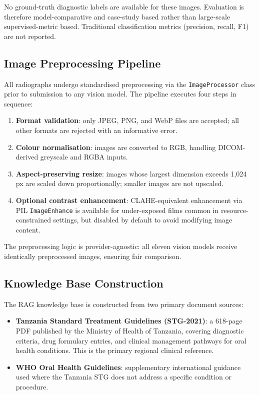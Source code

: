 \documentclass[12pt,a4paper]{report}
\begin{document}
No ground-truth diagnostic labels are available for these images.
Evaluation is therefore model-comparative and case-study based rather
than large-scale supervised-metric based.  Traditional classification
metrics (precision, recall, F1) are not reported.

\subsection{Image Preprocessing Pipeline}
\label{subsec:preproc}

All radiographs undergo standardised preprocessing via the
\texttt{ImageProcessor} class prior to submission to any vision model.
The pipeline executes four steps in sequence:

\begin{enumerate}
  \item \textbf{Format validation}: only JPEG, PNG, and WebP files are
        accepted; all other formats are rejected with an informative
        error.
  \item \textbf{Colour normalisation}: images are converted to RGB,
        handling DICOM-derived greyscale and RGBA inputs.
  \item \textbf{Aspect-preserving resize}: images whose largest
        dimension exceeds 1,024 px are scaled down proportionally;
        smaller images are not upscaled.
  \item \textbf{Optional contrast enhancement}: CLAHE-equivalent
        enhancement via PIL \texttt{ImageEnhance} is available for
        under-exposed films common in resource-constrained settings,
        but disabled by default to avoid modifying image content.
\end{enumerate}

The preprocessing logic is provider-agnostic: all eleven vision models
receive identically preprocessed images, ensuring fair comparison.

\subsection{Knowledge Base Construction}
\label{subsec:kb}

The RAG knowledge base is constructed from two primary document sources:

\begin{itemize}
  \item \textbf{Tanzania Standard Treatment Guidelines (STG-2021)}: a
        618-page PDF published by the Ministry of Health of
        Tanzania, covering diagnostic criteria, drug
        formulary entries, and clinical management pathways for oral
        health conditions.  This is the primary regional clinical
        reference.
  \item \textbf{WHO Oral Health Guidelines}:
        supplementary international guidance used where the Tanzania STG
        does not address a specific condition or procedure.
\end{itemize}
\end{document}
